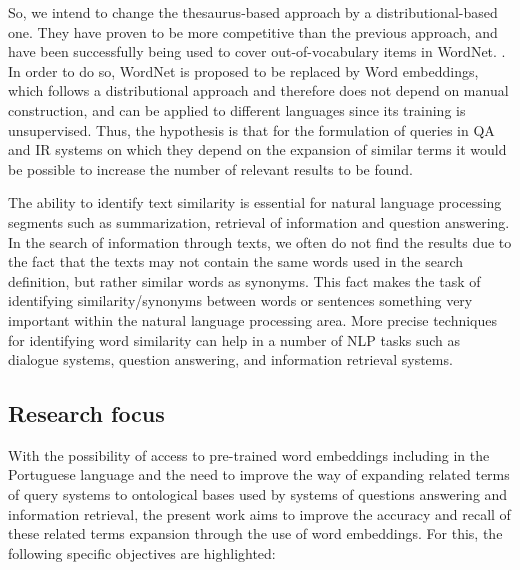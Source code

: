 So, we intend to change the thesaurus-based approach by a distributional-based one. They have proven to be more competitive than the previous approach, and have been successfully being used to cover out-of-vocabulary items in WordNet. \cite{Agirre2009}.
In order to do so, WordNet is proposed to be replaced by Word embeddings, which follows a distributional approach and therefore does not depend on manual construction, and can be applied to different languages since its training is unsupervised. Thus, the hypothesis is that for the formulation of queries in QA and IR systems on which they depend on the expansion of similar terms it would be possible to increase the number of relevant results to be found.

The ability to identify text similarity is essential for natural language processing segments such as summarization, retrieval of information and question answering. In the search of information through texts, we often do not find the results due to the fact that the texts may not contain the same words used in the search definition, but rather similar words as synonyms. This fact makes the task of identifying similarity/synonyms between words or sentences something very important within the natural language processing area. More precise techniques for identifying word similarity can help in a number of NLP tasks such as dialogue systems, question answering, and information retrieval systems. \cite{Islam2007ApplicationsOC, Pilehvar2013, Agirre2009}


\subsection{Research focus}

With the possibility of access to pre-trained word embeddings including in the Portuguese language and the need to improve the way of expanding related terms of query systems to ontological bases used by systems of questions answering and information retrieval, the present work aims to improve the accuracy and recall of these related terms expansion through the use of word embeddings. For this, the following specific objectives are highlighted:

